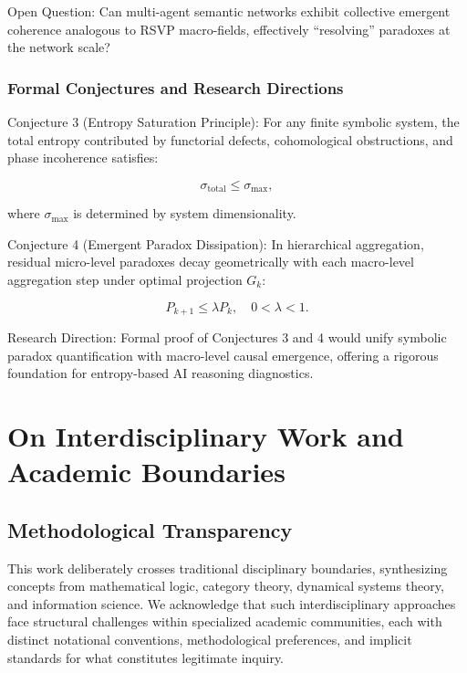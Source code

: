 \documentclass[12pt]{article}
\theoremstyle{plain}
\begin{document}
Open Question: Can multi-agent semantic networks exhibit collective emergent coherence analogous to RSVP macro-fields, effectively “resolving” paradoxes at the network scale?

\subsubsection{Formal Conjectures and Research Directions}

Conjecture 3 (Entropy Saturation Principle): For any finite symbolic system, the total entropy contributed by functorial defects, cohomological obstructions, and phase incoherence satisfies:

\begin{equation}
\sigma_\mathrm{total} \leq \sigma_\mathrm{max},
\end{equation}

where \(\sigma_\mathrm{max}\) is determined by system dimensionality.

Conjecture 4 (Emergent Paradox Dissipation): In hierarchical aggregation, residual micro-level paradoxes decay geometrically with each macro-level aggregation step under optimal projection \(G_k\):

\begin{equation}
P_{k+1} \leq \lambda P_k, \quad 0 < \lambda < 1.
\end{equation}

Research Direction: Formal proof of Conjectures 3 and 4 would unify symbolic paradox quantification with macro-level causal emergence, offering a rigorous foundation for entropy-based AI reasoning diagnostics.

\section{On Interdisciplinary Work and Academic Boundaries}

\subsection{Methodological Transparency}

This work deliberately crosses traditional disciplinary boundaries, synthesizing concepts from mathematical logic, category theory, dynamical systems theory, and information science. We acknowledge that such interdisciplinary approaches face structural challenges within specialized academic communities, each with distinct notational conventions, methodological preferences, and implicit standards for what constitutes legitimate inquiry.
\end{document}
